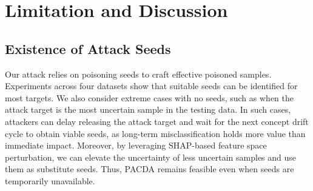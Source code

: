 \documentclass[conference,compsoc]{IEEEtran} %
\begin{document}

\section{Limitation and Discussion}

\subsection{Existence of Attack Seeds}
Our attack relies on poisoning seeds to craft effective poisoned samples.
Experiments across four datasets show that suitable seeds can be identified for most targets.
We also consider extreme cases with no seeds, such as when the attack target is the most uncertain sample in the testing data.
In such cases, attackers can delay releasing the attack target and wait for the next concept drift cycle to obtain viable seeds, as long-term misclassification holds more value than immediate impact.
Moreover, by leveraging SHAP-based feature space perturbation, we can elevate the uncertainty of less uncertain samples and use them as substitute seeds. 
Thus, PACDA remains feasible even when seeds are temporarily unavailable.
\end{document}
